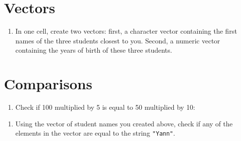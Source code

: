 \documentclass[
  letterpaper,
  DIV=11,
  numbers=noendperiod]{scrreprt}
\newenvironment{Shaded}{\begin{snugshade}}{\end{snugshade}}
\providecommand{\tightlist}{%
  \setlength{\itemsep}{0pt}\setlength{\parskip}{0pt}}
\begin{document}
\begin{Shaded}
\begin{Highlighting}[]

\end{Highlighting}
\end{Shaded}

\section{Vectors}\label{vectors-1}

\begin{enumerate}
\def\labelenumi{\arabic{enumi}.}
\setcounter{enumi}{10}
\tightlist
\item
  In one cell, create two vectors: first, a character vector containing
  the first names of the three students closest to you. Second, a
  numeric vector containing the years of birth of these three students.
\end{enumerate}

\begin{Shaded}
\begin{Highlighting}[]

\end{Highlighting}
\end{Shaded}

\section{Comparisons}\label{comparisons-1}

\begin{enumerate}
\def\labelenumi{\arabic{enumi}.}
\setcounter{enumi}{11}
\tightlist
\item
  Check if 100 multiplied by 5 is equal to 50 multiplied by 10:
\end{enumerate}

\begin{Shaded}
\begin{Highlighting}[]

\end{Highlighting}
\end{Shaded}

\begin{enumerate}
\def\labelenumi{\arabic{enumi}.}
\setcounter{enumi}{12}
\tightlist
\item
  Using the vector of student names you created above, check if any of
  the elements in the vector are equal to the string \texttt{"Yann"}.
\end{enumerate}
\end{document}
